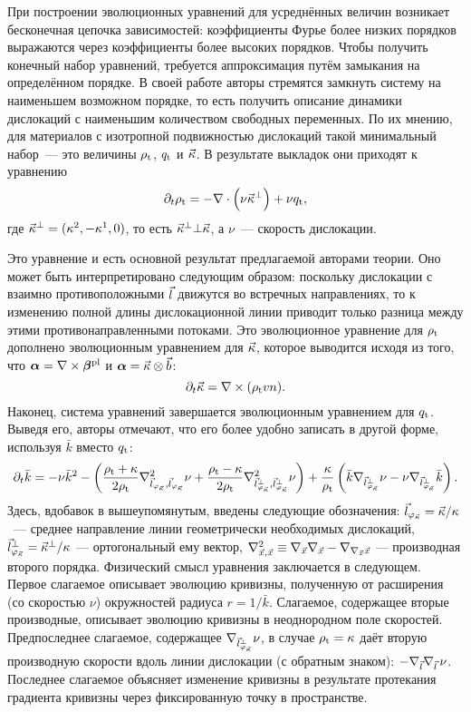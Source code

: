 \documentclass[a4paper, 14pt, titlepage]{extarticle}
\newcommand{\tot}{\textup{t}}    %
\newcommand{\plast}{\textup{pl}} %
\newcommand{\lfk}{\vect{l}_{\phi_{\vect{\kappa}}}}
\begin{document}
  При построении эволюционных уравнений для усреднённых величин возникает бесконечная цепочка
  зависимостей: коэффициенты Фурье более низких порядков выражаются через коэффициенты более высоких
  порядков. Чтобы получить конечный набор уравнений, требуется аппроксимация путём замыкания на
  определённом порядке. В своей работе авторы стремятся замкнуть систему на наименьшем возможном
  порядке, то есть получить описание динамики дислокаций с наименьшим количеством свободных
  переменных. По их мнению, для материалов с изотропной подвижностью дислокаций такой минимальный
  набор~--- это величины $\rho_\tot$, $q_\tot$ и $\vec{\kappa}$. В результате выкладок они приходят
  к уравнению
  \[
    \partial_t \rho_\tot = - \nabla \cdot \left( \nu \vec{\kappa}^\bot \right) + \nu q_\tot ,
  \]
  где $\vec{\kappa}^\bot = (\kappa^2, -\kappa^1, 0)$, то есть $\vec{\kappa}^\bot \bot \vec{\kappa}$,
  а $\nu$~--- скорость дислокации.

  Это уравнение и есть основной результат предлагаемой авторами теории. Оно может быть интерпретировано
  следующим образом: поскольку дислокации с взаимно противоположными $\vec{l}$ движутся во
  встречных направлениях, то к изменению полной длины дислокационной линии приводит только разница
  между этими противонаправленными потоками. Это эволюционное уравнение для $\rho_\tot$ дополнено
  эволюционным уравнением для $\vec{\kappa}$, которое выводится исходя из того, что
  $\matx{\alpha} = \nabla \times \matx{\beta}^\plast$ и $\bm{\alpha} = \vec{\kappa} \otimes \vec{b}$:
  \[
    \partial_t \vect{\kappa} = \nabla \times (\rho_\tot vn).
  \]
  Наконец, система уравнений завершается эволюционным уравнением для $q_\tot$. Выведя его, авторы
  отмечают, что его более удобно записать в другой форме, используя $\bar{k}$ вместо $q_\tot$:
  \[
    \partial_t \bar{k} = -\nu \bar{k}^2 - \left(
      \frac{\rho_\tot+\kappa}{2\rho_\tot} \nabla^2_{\lfk,\lfk}\nu +
      \frac{\rho_\tot-\kappa}{2\rho_\tot} \nabla^2_{\lfk^\bot,\lfk^\bot}\nu
    \right) + \frac{\kappa}{\rho_\tot} \left(
      \bar{k}\nabla_{\lfk^\bot}\nu -
          \nu\nabla_{\lfk^\bot}\bar{k}
    \right).
  \]
  Здесь, вдобавок в вышеупомянутым, введены следующие обозначения: $\lfk = \vect{\kappa}/\kappa$~---
  среднее направление линии геометрически необходимых дислокаций, $\lfk^\bot = \vect{\kappa}^\bot/\kappa$
  --- ортогональный ему вектор, $\nabla^2_{\vec{x},\vec{x}} \equiv \nabla_{\vec{x}} \nabla_{\vec{x}} - \nabla_{\nabla_{\vec{x}}\vec{x}}$
  --- производная второго порядка. Физический смысл уравнения заключается в следующем. Первое слагаемое
  описывает эволюцию кривизны, полученную от расширения (со скоростью $\nu$) окружностей радиуса $r = 1/\bar{k}$.
  Слагаемое, содержащее вторые производные, описывает эволюцию кривизны в неоднородном поле скоростей.
  Предпоследнее слагаемое, содержащее $\nabla_{\lfk^\bot}\nu$, в случае $\rho_\tot = \kappa$ даёт
  вторую производную скорости вдоль линии дислокации (с обратным знаком):
  $-\nabla_{\vec{l}}\nabla_{\vec{l}}\,\nu$.
  Последнее слагаемое объясняет изменение кривизны в результате протекания градиента кривизны через
  фиксированную точку в пространстве.
\end{document}

